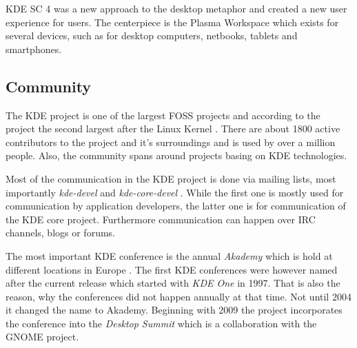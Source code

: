\ac{KDE SC} 4 was a new approach to the desktop metaphor and created a new user
experience for users. The centerpiece is the Plasma Workspace which exists for
several devices, such as for desktop computers, netbooks, tablets and
smartphones.


\subsection{Community} %

The KDE project is one of the largest FOSS projects and according to the
project the second largest after the Linux Kernel \cite{KDEPress}. There are
about 1800 active contributors to the project and it's surroundings and is used
by over a million people. Also, the community spans around projects basing on
KDE technologies.

Most of the communication in the KDE project is done via mailing lists, most
importantly \emph{kde-devel} and \emph{kde-core-devel}
\cite{KDEProjectManagement,KDEContribute}. While the first one is mostly used
for communication by application developers, the latter one is for
communication of the KDE core project. Furthermore communication can happen
over \ac{IRC} channels, blogs or forums.

The most important KDE conference is the annual \emph{Akademy} which is hold at
different locations in Europe \cite{KDEHistory}. The first KDE conferences were
however named after the current release which started with \emph{KDE One} in
1997. That is also the reason, why the conferences did not happen annually at
that time. Not until 2004 it changed the name to Akademy. Beginning with 2009
the project incorporates the conference into the \emph{Desktop Summit} which is
a collaboration with the GNOME project.

